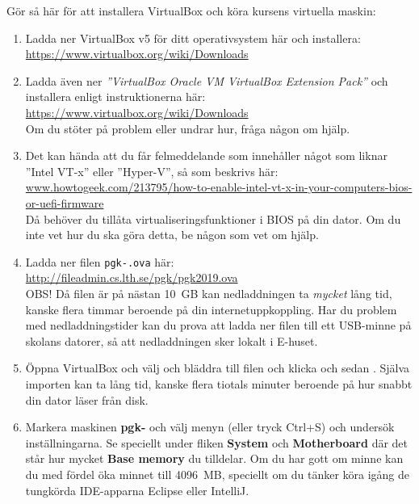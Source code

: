 Gör så här för att installera VirtualBox och köra kursens virtuella maskin:
\begin{enumerate}
\item  Ladda ner VirtualBox v5 för ditt operativsystem här och installera: \\ \url{https://www.virtualbox.org/wiki/Downloads}

\item Ladda även ner \textit{''VirtualBox Oracle VM VirtualBox Extension Pack''}  och installera enligt instruktionerna här:\\ \url{https://www.virtualbox.org/wiki/Downloads} \\ Om du stöter på problem eller undrar hur, fråga någon om hjälp.

\item Det kan hända att du får felmeddelande som innehåller något som liknar ''Intel VT-x'' eller ''Hyper-V'', så som beskrivs här:
\\ \href{http://www.howtogeek.com/213795/how-to-enable-intel-vt-x-in-your-computers-bios-or-uefi-firmware/}{www.howtogeek.com/213795/how-to-enable-intel-vt-x-in-your-computers-bios-or-uefi-firmware}\\
Då behöver du tillåta virtualiseringsfunktioner i BIOS på din dator. Om du inte vet hur du ska göra detta, be någon som vet om hjälp.

\item     Ladda ner filen \texttt{pgk-\VMName.ova} här: \\ \url{http://fileadmin.cs.lth.se/pgk/pgk2019.ova} \\ OBS! Då filen är på nästan 10~GB kan nedladdningen ta \textit{mycket} lång tid, kanske flera timmar beroende på din internetuppkoppling. Har du problem med nedladdningstider kan du prova att ladda ner filen till ett USB-minne på skolans datorer, så att nedladdningen sker lokalt i E-huset.

\item     Öppna VirtualBox och välj  och bläddra till filen  och klicka  och sedan . Själva importen kan ta lång tid, kanske flera tiotals minuter beroende på hur snabbt din dator läser från disk.

\item Markera maskinen \textbf{pgk-\VMName} och välj menyn  (eller tryck Ctrl+S) och undersök inställningarna. Se speciellt under fliken \textbf{System} och \textbf{Motherboard} där det står hur mycket \textbf{Base memory} du tilldelar. Om du har gott om minne kan du med fördel öka minnet till 4096~MB, speciellt om du tänker köra igång de tungkörda IDE-apparna Eclipse eller IntelliJ.


\end{enumerate}
